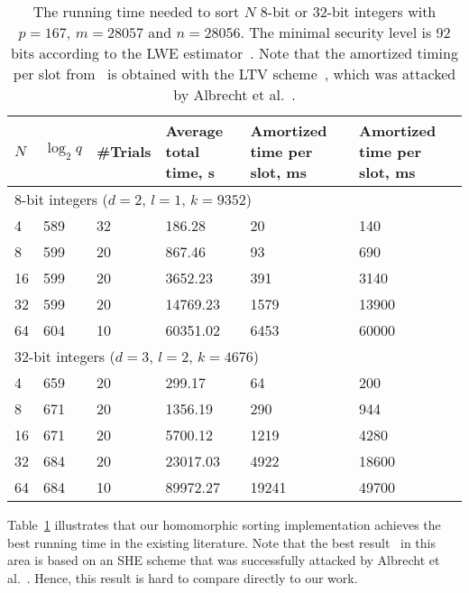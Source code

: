 \begin{table}[h]
  \centering
  \begin{tabular*}{.45\textwidth}{ p{0.3cm} p{0.7cm} p{0.8cm} p{1cm} p{1.3cm} p{1.5cm}}
    \toprule
    $N$     & $\log_2 q$    & \#Trials  & Average total time, s & Amortized time per slot, ms & Amortized time per slot, ms~\cite{CDSS15} \\
    \midrule
    \multicolumn{6}{l}{8-bit integers ($d=2$, $l=1$, $k=9352$)} \\
    \cmidrule(lr){1-6}
    4       & 589     & 32        & 186.28       & 20    & 140 \\
    8       & 599     & 20        & 867.46       & 93    & 690 \\
    16      & 599     & 20        & 3652.23      & 391   & 3140\\
    32      & 599     & 20        & 14769.23     & 1579  & 13900 \\
    64      & 604     & 10        & 60351.02     & 6453  & 60000 \\
    \midrule
    \multicolumn{6}{l}{32-bit integers ($d=3$, $l=2$, $k=4676$)} \\
    \cmidrule(lr){1-6}
    4       & 659     & 20        & 299.17       & 64    & 200 \\
    8       & 671     & 20        & 1356.19      & 290   & 944 \\
    16      & 671     & 20        & 5700.12      & 1219  & 4280 \\
    32      & 684     & 20        & 23017.03     & 4922  & 18600 \\
    64      & 684     & 10        & 89972.27     & 19241 & 49700 \\
    \bottomrule
  \end{tabular*}
  \caption{The running time needed to sort $N$ 8-bit or 32-bit integers with $p=167$, $m=28057$ and $n=28056$. The minimal security level is 92 bits according to the LWE estimator~\cite{lwe_estimator}. Note that the amortized timing per slot from~\cite{CDSS15} is obtained with the LTV scheme~\cite{STOC:LopTroVai12}, which was attacked by Albrecht et al.~\cite{C:AlbBaiDuc16}.}
  \label{table:sorting_circuit_results}
\end{table}

Table~\ref{table:sorting_circuit_results} illustrates that our homomorphic sorting implementation achieves the best running time in the existing literature.
Note that the best result~\cite{CDSS15} in this area is based on an SHE scheme that was successfully attacked by Albrecht et al.~\cite{C:AlbBaiDuc16}.
Hence, this result is hard to compare directly to our work.

